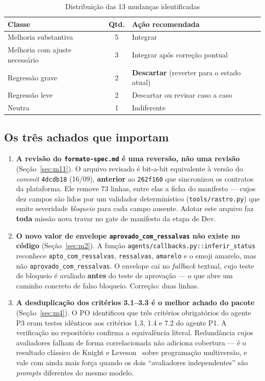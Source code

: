 \documentclass[11pt,a4paper]{article}
\newcommand{\cod}[1]{\texttt{\small #1}}
\begin{document}
\begin{table}[h]
\centering
\caption{Distribuição das 13 mudanças identificadas}
\begin{tabular}{lcl}
\toprule
\textbf{Classe} & \textbf{Qtd.} & \textbf{Ação recomendada} \\
\midrule
Melhoria substantiva            & 5 & Integrar \\
Melhoria com ajuste necessário  & 3 & Integrar após correção pontual \\
Regressão grave                 & 2 & \textbf{Descartar} (reverter para o estado atual) \\
Regressão leve                  & 2 & Descartar ou revisar caso a caso \\
Neutra                          & 1 & Indiferente \\
\bottomrule
\end{tabular}
\end{table}

\subsection{Os três achados que importam}

\begin{enumerate}[leftmargin=*]
  \item \textbf{A revisão do \cod{formato-spec.md} é uma reversão, não uma revisão} (Seção~\ref{sec:m11}).
  O arquivo revisado é bit-a-bit equivalente à versão do \textit{commit} \cod{4dcdb18} (16/09), \textbf{anterior}
  ao \cod{262f160} que sincronizou os contratos da plataforma. Ele remove 73 linhas, entre elas a ficha do
  manifesto --- cujos dez campos são lidos por um validador determinístico (\cod{tools/rastro.py}) que emite
  severidade \textit{bloqueio} para cada campo ausente. Adotar este arquivo faz \textbf{toda} missão nova
  travar no gate de manifesto da etapa de Dev.

  \item \textbf{O novo valor de envelope \cod{aprovado\_com\_ressalvas} não existe no código} (Seção~\ref{sec:m2}).
  A função \cod{agents/callbacks.py::inferir\_status} reconhece \cod{apto\_com\_ressalvas}, \cod{ressalvas},
  \cod{amarelo} e o emoji amarelo, mas não \cod{aprovado\_com\_ressalvas}. O envelope cai no \textit{fallback}
  textual, cujo teste de bloqueio é avaliado \textbf{antes} do teste de aprovação --- o que abre um caminho
  concreto de falso bloqueio. Correção: duas linhas.

  \item \textbf{A desduplicação dos critérios 3.1--3.3 é o melhor achado do pacote} (Seção~\ref{sec:m4}).
  O PO identificou que três critérios obrigatórios do agente P3 eram testes idênticos aos critérios 1.3, 1.4
  e 7.2 do agente P1. A verificação no repositório confirma a equivalência literal. Redundância cujos
  avaliadores falham de forma correlacionada não adiciona cobertura --- é o resultado clássico de
  Knight e Leveson~\cite{knight1986} sobre programação multiversão, e vale com ainda mais força quando os
  dois ``avaliadores independentes'' são \textit{prompts} diferentes do mesmo modelo.
\end{enumerate}
\end{document}
